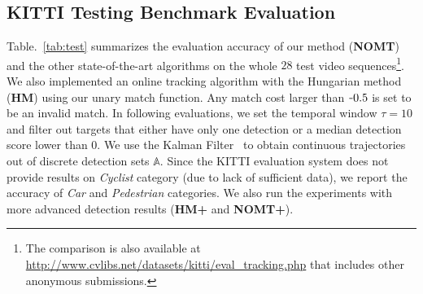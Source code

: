 \documentclass[10pt,twocolumn,letterpaper]{article}
\newcommand{\minus}{\scalebox{0.5}[1.0]{$-$}}
\begin{document}
\subsection{KITTI Testing Benchmark Evaluation}

Table.~\ref{tab:test} summarizes the evaluation accuracy of our method ({\bf NOMT}) and the other state-of-the-art algorithms on the whole $28$ test video sequences\footnote{The comparison is also available at \url{http://www.cvlibs.net/datasets/kitti/eval_tracking.php} that includes other anonymous submissions.}. 
We also implemented an online tracking algorithm with the Hungarian method~\cite{Kuhn_NRLQ_55} ({\bf HM}) using our unary match function. Any match cost larger than $\minus 0.5$ is set to be an invalid match.
In following evaluations, we set the temporal window $\tau = 10$ and filter out targets that either have only one detection or a median detection score lower than $0$. We use the Kalman Filter~\cite{welch1995introduction} to obtain continuous trajectories out of discrete detection sets $\mathbb{A}$.
Since the KITTI evaluation system does not provide results on \emph{Cyclist} category (due to lack of sufficient data), we report the accuracy of \emph{Car} and \emph{Pedestrian} categories. We also run the experiments with more advanced detection results ({\bf HM+\cite{wang2013regionlets}} and {\bf NOMT+\cite{wang2013regionlets}}).
\end{document}
